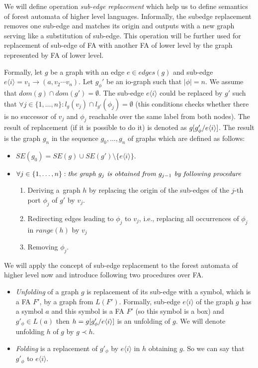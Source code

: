 We will define operation \emph{sub-edge replacement} which help us to define semantics of forest automata of higher level languages.
Informally, the subedge replacement removes one sub-edge and matches its origin and outputs with a new graph serving like a substitution of sub-edge.
This operation will be further used for replacement of sub-edge of FA with another FA of lower level by the graph represented by FA of lower level.

Formally, let $g$ be a graph with an edge $e \in edges(g)$ and sub-edge $e\langle i\rangle = v_1 \rightarrow (a,v_2 \cdots v_n)$.
Let $g_{\phi}'$ be an io-graph such that $|\phi| = n$.
We assume that $dom(g) \cap dom(g') = \emptyset$.
The sub-edge $e\langle i\rangle$ could be replaced by $g'$ such that $\forall j \in \{1,\ldots,n\}: l_{g}(v_j) \cap
l_{g'}(\phi_j) = \emptyset$
(this conditions checks whether there is no successor of $v_j$ and $\phi_j$ reachable over the same
label from both nodes).
The result of replacement (if it is possible to do it) is denoted as $g[g'_\phi/e\langle i\rangle]$.
The result is the graph $g_n$ in the sequence $g_0,\ldots,g_n$ of graphs which are defined as follows: 
\begin{itemize}
	\item $SE(g_0) = SE(g) \cup SE(g') \setminus \{e\langle i\rangle\}$.
	\item $\forall j \in \{1, \ldots, n\}: \emph{the graph } g_j \emph{ is obtained from } g_{j-1} \emph{ by following procedure }$
		\begin{enumerate}
			\item Deriving a~graph $h$ by replacing the origin of the sub-edges of the $j$-th port $\phi_j$ of $g'$ by $v_j$.
			\item Redirecting edges leading to $\phi_{j}$ to $v_j$, i.e., replacing all occurrences of $\phi_j$ in $range(h)$ by $v_j$
			\item Removing $\phi_j$. 
		\end{enumerate}
\end{itemize}

We will apply the concept of sub-edge replacement to the forest automata of higher level now
and introduce following two procedures over FA.
\begin{itemize}
	\item \emph{Unfolding} of a graph $g$ is replacement of its sub-edge with a symbol, which is
		a FA $F'$, by a graph from $L(F')$.
		Formally, sub-edge $e\langle i \rangle$ of the graph $g$ has a symbol $a$ and this symbol is a FA $F'$ (so this symbol is a box)
		and $g'_\phi \in L(a)$ then $h = g [g'_\phi/e\langle i \rangle]$ is an unfolding of $g$.
		We will denote unfolding $h$ of $g$ by $g \prec h$.
	\item \emph{Folding} is a replacement of $g'_\phi$ by $e \langle i \rangle$ in $h$ obtaining $g$.
		So we can say that $g'_\phi$ to $e \langle i \rangle$. 
\end{itemize}

